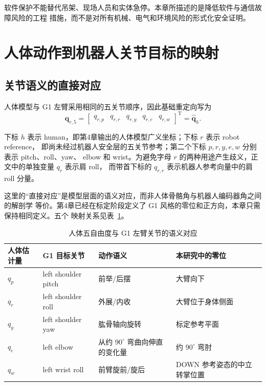 软件保护不能替代吊架、现场人员和实体急停。本章所描述的是降低软件与通信故障风险的工程
措施，而不是对所有机械、电气和环境风险的形式化安全证明。

\section{人体动作到机器人关节目标的映射}
\label{sec:ch5_human_robot_mapping}

\subsection{关节语义的直接对应}
\label{subsec:ch5_semantic_mapping}

人体模型与 G1 左臂采用相同的五关节顺序，因此基础重定向写为
\begin{equation}
  \boldsymbol q_{r,5}=
  \begin{bmatrix}
    q_{r,p}&q_{r,r}&q_{r,y}&q_{r,e}&q_{r,w}
  \end{bmatrix}^{\mathrm T}
  =\hat{\boldsymbol q}_h.
  \label{eq:ch5_direct_semantic_mapping}
\end{equation}

下标 $h$ 表示 human，即第4章输出的人体模型广义坐标；下标 $r$ 表示 robot reference，
即尚未经过机器人安全层的五关节参考；第二个下标 $p,r,y,e,w$ 分别表示 pitch、roll、yaw、
elbow 和 wrist。为避免字母 $r$ 的两种用途产生歧义，正文中的单独变量 $q_r$ 表示肩 roll，
而带首下标的 $q_{r,r}$ 表示机器人参考向量中的肩 roll 分量。

这里的“直接对应”是模型层面的语义对应，而非人体骨骼角与机器人编码器角之间的解剖学
等价。第4章已经在标定阶段定义了 G1 风格的零位和正方向，本章只需保持相同定义。五个
映射关系见表~\ref{tab:ch5_semantic_mapping}。

\begin{table}[htbp]
  \centering
  \caption{人体五自由度与 G1 左臂关节的语义对应}
  \label{tab:ch5_semantic_mapping}
  \begin{tabularx}{\linewidth}{@{}lXXX@{}}
    \toprule
    人体估计量 & G1 目标关节 & 动作语义 & 本研究中的零位 \\
    \midrule
    $q_p$ & left shoulder pitch & 前举/后摆 & 大臂向下 \\
    $q_r$ & left shoulder roll & 外展/内收 & 大臂位于身体侧面 \\
    $q_y$ & left shoulder yaw & 肱骨轴向旋转 & 标定参考平面 \\
    $q_e$ & left elbow & 从约 $90^\circ$ 弯曲向伸直的变化量 & 约 $90^\circ$ 弯肘 \\
    $q_w$ & left wrist roll & 前臂旋前/旋后 & DOWN 参考姿态的中立转掌位置 \\
    \bottomrule
  \end{tabularx}
\end{table}

